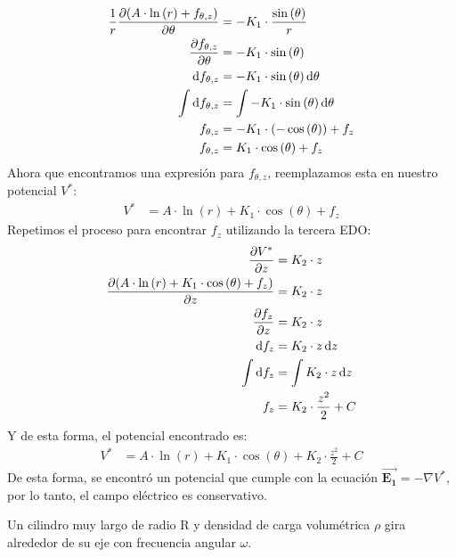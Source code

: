\documentclass[
  11pt,
  letterpaper,
   answers
  ]{exam}
\begin{document}
\begin{questions}
\begin{solution}
\begin{parts}
\begin{align}
        \frac{1}{r} \frac{\partial (A\cdot \ln{(r)} + f_{\theta, z})}{\partial \theta} &= -K_1 \cdot \frac{\sin{(\theta)}}{r} \\
        \frac{\partial f_{\theta , z}}{\partial\theta} &= -K_1 \cdot \sin{(\theta)} \\
        \dif{f_{\theta , z}} &= -K_1 \cdot \sin{(\theta)} \dif{\theta} \\
        \int\dif{f_{\theta , z}} &=\int -K_1 \cdot \sin{(\theta)} \dif{\theta} \\
        f_{\theta , z} &= -K_1 \cdot (-\cos{(\theta)}) + f_z \\
        f_{\theta , z} &= K_1 \cdot \cos{(\theta)} + f_z
    \end{align}
    Ahora que encontramos una expresión para $f_{\theta , z}$, reemplazamos esta en nuestro potencial $V^*$:
    \begin{align}
  V^* &= A\cdot \ln{(r)} + K_1 \cdot \cos{(\theta)} + f_z
    \end{align}
    Repetimos el proceso para encontrar $f_z$ utilizando la tercera EDO:
    \begin{align}
        \frac{\partial V^*}{\partial z} &= K_2 \cdot z \\
  \frac{\partial (A\cdot \ln{(r)} + K_1 \cdot \cos{(\theta)} + f_z)}{\partial z} &= K_2 \cdot z \\
        \frac{\partial f_z}{\partial z} &= K_2 \cdot z \\
        \dif{f_z} &= K_2 \cdot z \dif{z} \\
        \int \dif{f_z} &= \int K_2 \cdot z \dif{z} \\
        f_z &= K_2 \cdot \frac{z^2}{2} + C
    \end{align}
    Y de esta forma, el potencial encontrado es:
    \begin{align}
  V^* &= A\cdot \ln{(r)} + K_1 \cdot \cos{(\theta)} + K_2 \cdot \frac{z^2}{2} + C
    \end{align}
    De esta forma, se encontró un potencial que cumple con la ecuación $\vec{\mathbf{E_1}}= -\nabla V^*$, por lo tanto, el campo eléctrico es conservativo.
    
    
      
    \end{parts}
\end{solution}

\question \label{q:rot_cyl} Un cilindro muy largo de radio R y densidad de carga volumétrica $\rho$ gira alrededor de su eje con frecuencia angular $\omega$. 
\begin{parts}

\end{parts}
\end{questions}
\end{document}
